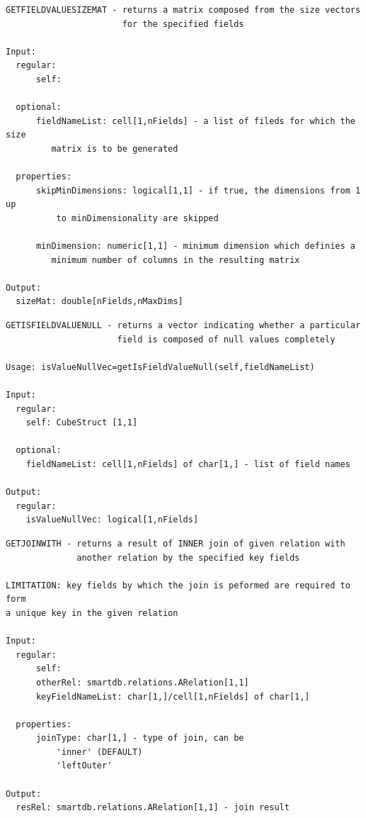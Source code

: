\documentclass[letterpaper,10pt,english]{sphinxmanual}
\begin{document}
\begin{Verbatim}[commandchars=\\\{\}]
GETFIELDVALUESIZEMAT - returns a matrix composed from the size vectors
                       for the specified fields

Input:
  regular:
      self:

  optional:
      fieldNameList: cell[1,nFields] - a list of fileds for which the size
         matrix is to be generated

  properties:
      skipMinDimensions: logical[1,1] - if true, the dimensions from 1 up
          to minDimensionality are skipped

      minDimension: numeric[1,1] - minimum dimension which definies a
         minimum number of columns in the resulting matrix

Output:
  sizeMat: double[nFields,nMaxDims]
\end{Verbatim}

\begin{Verbatim}[commandchars=\\\{\}]
GETISFIELDVALUENULL - returns a vector indicating whether a particular
                      field is composed of null values completely

Usage: isValueNullVec=getIsFieldValueNull(self,fieldNameList)

Input:
  regular:
    self: CubeStruct [1,1]

  optional:
    fieldNameList: cell[1,nFields] of char[1,] - list of field names

Output:
  regular:
    isValueNullVec: logical[1,nFields]
\end{Verbatim}

\begin{Verbatim}[commandchars=\\\{\}]
GETJOINWITH - returns a result of INNER join of given relation with
              another relation by the specified key fields

LIMITATION: key fields by which the join is peformed are required to form
a unique key in the given relation

Input:
  regular:
      self:
      otherRel: smartdb.relations.ARelation[1,1]
      keyFieldNameList: char[1,]/cell[1,nFields] of char[1,]

  properties:
      joinType: char[1,] - type of join, can be
          'inner' (DEFAULT)
          'leftOuter'

Output:
  resRel: smartdb.relations.ARelation[1,1] - join result
\end{Verbatim}
\end{document}

